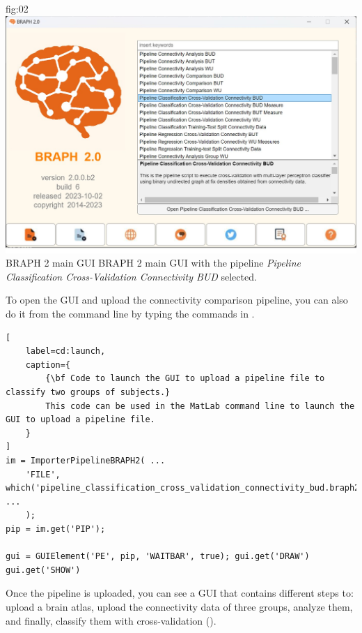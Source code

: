 \documentclass[justified]{tufte-handout}
\begin{document}
{
	{fig:02}
	{
	\includegraphics{fig02.jpg}
	}
	{BRAPH 2 main GUI}
	{
	BRAPH 2 main GUI with the pipeline \emph{Pipeline Classification Cross-Validation Connectivity BUD} selected.
	}

\begin{tcolorbox}[
	title=Pipeline launch from command line
]
To open the GUI and upload the connectivity comparison pipeline, you can also do it from the command line by typing the commands in .
%
\begin{lstlisting}[
	label=cd:launch,
	caption={
		{\bf Code to launch the GUI to upload a pipeline file to classify two groups of subjects.}
		This code can be used in the MatLab command line to launch the GUI to upload a pipeline file.
	}
]
im = ImporterPipelineBRAPH2( ...
	'FILE', which('pipeline_classification_cross_validation_connectivity_bud.braph2') ...
	);
pip = im.get('PIP');

gui = GUIElement('PE', pip, 'WAITBAR', true); gui.get('DRAW')
gui.get('SHOW')
\end{lstlisting}
\end{tcolorbox}

Once the pipeline is uploaded, you can see a GUI that contains different steps to: upload a brain atlas, upload the connectivity data of three groups, analyze them, and finally, classify them with cross-validation (). 

}
\end{document}
